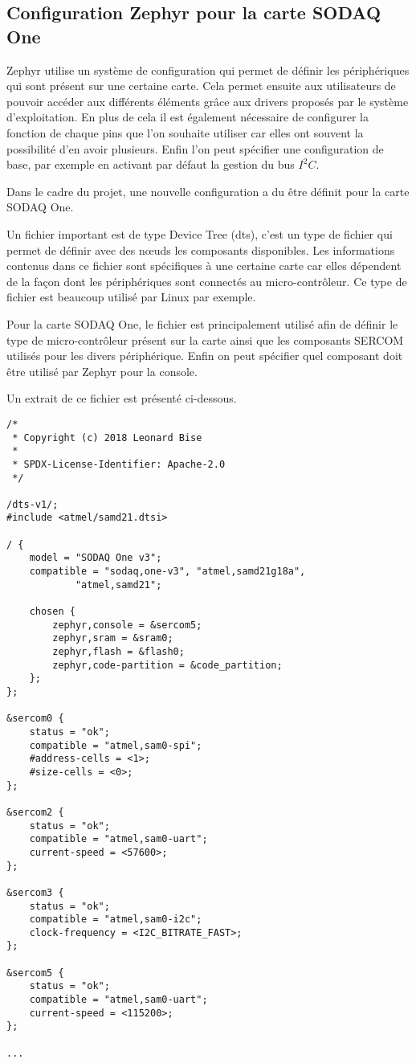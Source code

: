 \subsection{Configuration Zephyr pour la carte SODAQ One}

Zephyr utilise un système de configuration qui permet de définir les périphériques qui sont présent sur une certaine carte. Cela permet ensuite aux utilisateurs de pouvoir accéder aux différents éléments grâce aux drivers proposés par le système d'exploitation. En plus de cela il est également nécessaire de configurer la fonction de chaque pins que l'on souhaite utiliser car elles ont souvent la possibilité d'en avoir plusieurs. Enfin l'on peut spécifier une configuration de base, par exemple en activant par défaut la gestion du bus $I^{2}C$.

Dans le cadre du projet, une nouvelle configuration a du être définit pour la carte SODAQ One.

Un fichier important est de type Device Tree (dts), c'est un type de fichier qui permet de définir avec des nœuds les composants disponibles. Les informations contenus dans ce fichier sont spécifiques à une certaine carte car elles dépendent de la façon dont les périphériques sont connectés au micro-contrôleur. Ce type de fichier est beaucoup utilisé par Linux par exemple.

Pour la carte SODAQ One, le fichier est principalement utilisé afin de définir le type de micro-contrôleur présent sur la carte ainsi que les composants SERCOM utilisés pour les divers périphérique. Enfin on peut spécifier quel composant doit être utilisé par Zephyr pour la console.

Un extrait de ce fichier est présenté ci-dessous.

\begin{lstlisting}
/*
 * Copyright (c) 2018 Leonard Bise
 *
 * SPDX-License-Identifier: Apache-2.0
 */

/dts-v1/;
#include <atmel/samd21.dtsi>

/ {
	model = "SODAQ One v3";
	compatible = "sodaq,one-v3", "atmel,samd21g18a",
			"atmel,samd21";

	chosen {
		zephyr,console = &sercom5;
		zephyr,sram = &sram0;
		zephyr,flash = &flash0;
		zephyr,code-partition = &code_partition;
	};
};

&sercom0 {
	status = "ok";
	compatible = "atmel,sam0-spi";
	#address-cells = <1>;
	#size-cells = <0>;
};

&sercom2 {
	status = "ok";
	compatible = "atmel,sam0-uart";
	current-speed = <57600>;
};

&sercom3 {
	status = "ok";
	compatible = "atmel,sam0-i2c";
	clock-frequency = <I2C_BITRATE_FAST>;	
};

&sercom5 {
	status = "ok";
	compatible = "atmel,sam0-uart";
	current-speed = <115200>;
};

...

\end{lstlisting}

